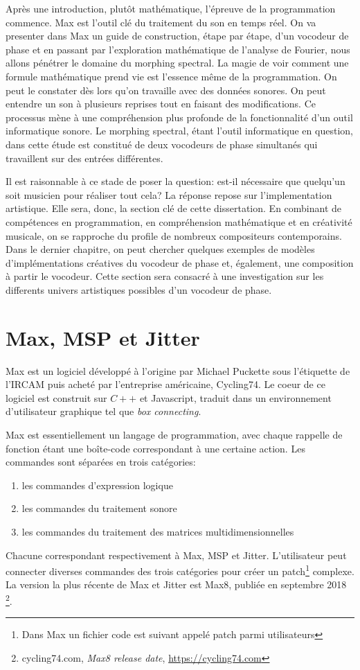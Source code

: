 Après une introduction, plutôt mathématique, l'épreuve de la programmation commence. Max est l'outil clé du traitement du son en temps réel. On va presenter dans Max un guide de construction, étape par étape, d’un vocodeur de phase et en passant par l'exploration mathématique de l'analyse de Fourier, nous allons pénétrer le domaine du morphing spectral. La magie de voir comment une formule mathématique prend vie est l'essence même de la programmation. On peut le constater dès lors qu’on travaille avec des données sonores. On peut entendre un son à plusieurs reprises tout en faisant des modifications. Ce processus mène à une compréhension plus profonde de la fonctionnalité d'un outil informatique sonore. Le morphing spectral, étant l'outil informatique en question, dans cette étude est constitué de deux vocodeurs de phase simultanés qui travaillent sur des entrées différentes.

Il est raisonnable à ce stade de poser la question: est-il nécessaire que quelqu’un soit musicien pour réaliser tout cela? La réponse repose sur l'implementation artistique. Elle sera, donc, la section clé de cette dissertation. En combinant de compétences en programmation, en compréhension mathématique et en créativité musicale, on se rapproche du profile de nombreux compositeurs contemporains. Dans le dernier chapitre, on peut chercher quelques exemples de modèles d'implémentations créatives du vocodeur de phase et, également, une composition à partir le vocodeur. Cette section sera consacré à une investigation sur les differents univers artistiques possibles d'un vocodeur de phase.

\section{Max, MSP et Jitter}

Max est un logiciel développé à l'origine par Michael Puckette sous l'étiquette de l'IRCAM puis acheté par l’entreprise américaine, Cycling74. Le coeur de ce logiciel est construit sur $C++$ et Javascript, traduit dans un environnement d’utilisateur graphique tel que \textit{box connecting}.

Max est essentiellement un langage de programmation, avec chaque rappelle de fonction étant une boîte-code correspondant à une certaine action. Les commandes sont séparées en trois catégories: 
\begin{enumerate}
	\item
	les commandes d'expression logique
	\item
	les commandes du traitement sonore
	\item
	les commandes du traitement des matrices multidimensionnelles	
\end{enumerate}
Chacune correspondant respectivement à Max, MSP et Jitter. L'utilisateur peut connecter diverses commandes des trois catégories pour créer un patch\footnote{Dans Max un fichier code est suivant appelé \guillemotleft patch \guillemotright parmi utilisateurs} complexe. La version la plus récente de Max et Jitter est Max8, publiée en septembre 2018 \footnote{cycling74.com, \textit{Max8 release date}, \href{https://cycling74.com}{https://cycling74.com} \nocite{cycling74}}.

